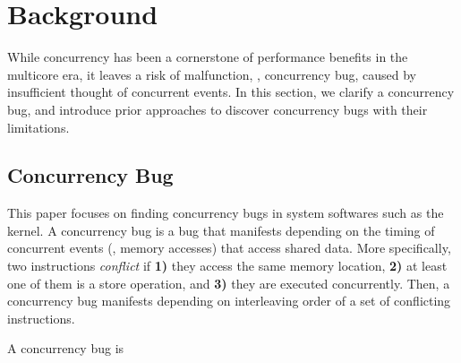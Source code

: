 \section{Background}
\label{s:background}

While concurrency has been a cornerstone of performance benefits in
the multicore era, it leaves a risk of malfunction, \ie, concurrency
bug, caused by insufficient thought of concurrent events.
%
In this section, we clarify a concurrency bug, and introduce prior
approaches to discover concurrency bugs with their limitations.

\subsection{Concurrency Bug}
\label{ss:concurrencybugs}


This paper focuses on finding concurrency bugs in system softwares
such as the kernel.
%
A concurrency bug is a bug that manifests depending on the timing of
concurrent events (\eg, memory accesses) that access shared data.
%
More specifically, two instructions \textit{conflict} if \textbf{1)}
they access the same memory location, \textbf{2)} at least one of them
is a store operation, and \textbf{3)} they are executed concurrently.
%
Then, a concurrency bug manifests depending on interleaving order of a
set of conflicting instructions.

A concurrency bug is







